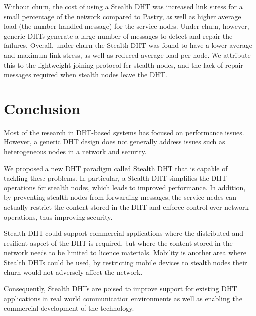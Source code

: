 \documentclass{sig-alt-release2}
\begin{document}
Without churn, the cost of using a Stealth DHT was increased link
stress for a small percentage of the network compared to Pastry, as
well as higher average load (the number handled message) for the
service nodes. Under churn, however, generic DHTs generate a large
number of messages to detect and repair the failures. Overall, under
churn the Stealth DHT was found to have a lower average and maximum
link stress, as well as reduced average load per node. We attribute
this to the lightweight joining protocol for stealth nodes, and the
lack of repair messages required when stealth nodes leave the DHT.

\section{Conclusion}
\label{sect:conclusion}

Most of the research in DHT-based systems has focused on performance
issues. However, a generic DHT design does not generally address
issues such as heterogeneous nodes in a network and security.

We proposed a new DHT paradigm called Stealth DHT that is capable of
tackling these problems. In particular, a Stealth DHT simplifies the
DHT operations for stealth nodes, which leads to improved
performance. In addition, by preventing stealth nodes from
forwarding messages, the service nodes can actually restrict the
content stored in the DHT and enforce control over network
operations, thus improving security.

Stealth DHT could support commercial applications where the
distributed and resilient aspect of the DHT is required, but where
the content stored in the network needs to be limited to licence
materials. Mobility is another area where Stealth DHTs could be
used, by restricting mobile devices to stealth nodes their churn
would not adversely affect the network.

Consequently, Stealth DHTs are poised to improve support for
existing DHT applications in real world communication environments
as well as enabling the commercial development of the technology.
\end{document}
